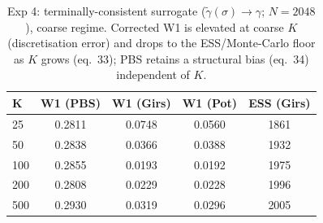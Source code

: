 \begin{table}[ht]
\centering
\caption{Exp 4: terminally-consistent surrogate ($\tilde\gamma(\sigma)\to\gamma$; $N=2048$), coarse regime. Corrected W1 is elevated at coarse $K$ (discretisation error) and drops to the ESS/Monte-Carlo floor as $K$ grows (eq.~33); PBS retains a structural bias (eq.~34) independent of $K$.}
\label{tab:toy_4}
\begin{tabular}{lcccc}
\toprule
K & W1 (PBS) & W1 (Girs) & W1 (Pot) & ESS (Girs) \\
\midrule
25 & 0.2811 & 0.0748 & 0.0560 & 1861 \\
50 & 0.2838 & 0.0366 & 0.0388 & 1932 \\
100 & 0.2855 & 0.0193 & 0.0192 & 1975 \\
200 & 0.2808 & 0.0229 & 0.0228 & 1996 \\
500 & 0.2930 & 0.0319 & 0.0296 & 2005 \\
\bottomrule
\end{tabular}
\end{table}
